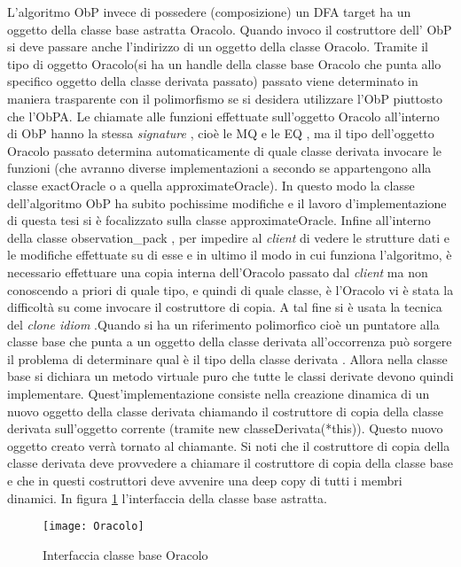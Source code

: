 L'algoritmo \ac{ObP} invece di possedere (composizione) un \ac{DFA} target ha un oggetto della classe base astratta Oracolo. Quando invoco il costruttore dell' \ac{ObP}  si deve passare anche l'indirizzo di un oggetto della classe Oracolo. Tramite il tipo di oggetto Oracolo(si ha un handle della classe base Oracolo che punta allo specifico oggetto della classe derivata passato) passato  viene determinato in maniera trasparente con il polimorfismo se si desidera utilizzare l'\ac{ObP} piuttosto che l'\ac{ObPA}. Le chiamate alle funzioni effettuate sull'oggetto Oracolo all'interno di \ac{ObP} hanno la stessa \textit{signature} , cioè le \ac{MQ} e le \ac{EQ} , ma il tipo dell'oggetto Oracolo passato determina automaticamente di quale classe derivata invocare le funzioni (che avranno diverse implementazioni a secondo se appartengono alla classe exactOracle o a quella approximateOracle).  In questo modo la classe dell'algoritmo \ac{ObP} ha subito pochissime modifiche  e il lavoro d'implementazione di questa tesi si è focalizzato sulla classe approximateOracle. Infine all'interno della classe observation\_pack , per impedire al \textit{client} di vedere le strutture dati e le modifiche effettuate su di esse  e in ultimo il modo in cui funziona l'algoritmo, è necessario effettuare una copia interna dell'Oracolo passato dal \textit{client} ma non conoscendo a priori di quale tipo, e quindi di quale classe, è l'Oracolo vi è stata la difficoltà su come invocare il costruttore di copia. A tal fine si è usata la tecnica del \textit{clone idiom} .Quando si ha un riferimento polimorfico cioè un 
  puntatore alla classe base che punta a un oggetto della classe derivata all'occorrenza può sorgere il problema di determinare qual è il tipo della classe derivata . Allora nella classe base si dichiara un metodo virtuale puro che tutte le classi derivate devono quindi implementare. Quest'implementazione consiste nella creazione dinamica  di un nuovo oggetto della classe derivata chiamando il costruttore di copia della classe derivata sull'oggetto corrente (tramite new classeDerivata(*this)). Questo nuovo oggetto creato verrà tornato al chiamante. Si noti che il costruttore di copia della classe derivata deve provvedere a chiamare il costruttore di copia della classe base e che in questi costruttori deve avvenire una deep copy di tutti i membri dinamici.   In figura \ref{fig:cba} l'interfaccia della classe base astratta.
  
 \begin{figure}[htp]
	\centering
	\texttt{[image: Oracolo]}
	\caption[Interfaccia classe base Oracolo]{Interfaccia classe base Oracolo}
   \label{fig:cba}
\end{figure}    